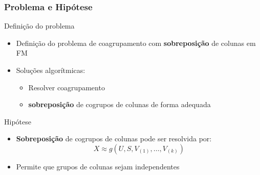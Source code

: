 \documentclass[10pt]{beamer}
\begin{document}
\begin{frame}
  \frametitle{Problema e Hipótese}

  \begin{block}{Definição do problema}
    \begin{itemize}
      \item Definição do problema de coagrupamento com \textbf{sobreposição} de colunas em FM
      \item Soluções algorítmicas:
        \begin{itemize}
          \item Resolver coagrupamento
          \item \textbf{sobreposição} de cogrupos de colunas de forma adequada
        \end{itemize}
    \end{itemize}
  \end{block}





  \begin{block}{Hipótese}
    \begin{itemize}
      \item \textbf{Sobreposição} de cogrupos de colunas pode ser resolvida por:
        $$X \approx g(U, S, V_{(1)}, \dots, V_{(k)})$$
      \item Permite que grupos de colunas sejam independentes
    \end{itemize}
  \end{block}

\end{frame}


\end{document}
